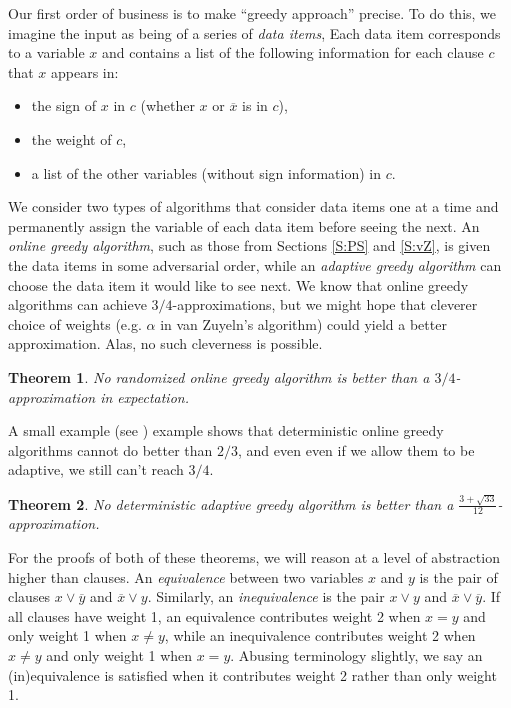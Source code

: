 \documentclass[11pt,letter]{article}
\newtheorem{theorem}{Theorem}
\numberwithin{theorem}{section}
\newcommand{\ol}{\overline}
\begin{document}
Our first order of business is to make ``greedy approach'' precise.
To do this, we imagine the input as being of a series of \emph{data items},
Each data item corresponds to a variable $x$
and contains a list of the following information
for each clause $c$ that $x$ appears in:
\begin{itemize}
\item
  the sign of $x$ in $c$ (whether $x$ or $\ol{x}$ is in $c$),
\item
  the weight of $c$,
\item
  a list of the other variables (without sign information) in $c$.
\end{itemize}
We consider two types of algorithms that consider data items one at a time
and permanently assign the variable of each data item before seeing the next.
An \emph{online greedy algorithm},
such as those from Sections \ref{S:PS} and \ref{S:vZ},
is given the data items in some adversarial order,
while an \emph{adaptive greedy algorithm}
can choose the data item it would like to see next.
We know that online greedy algorithms can achieve $3/4$-approximations,
but we might hope that cleverer choice of weights
(e.g. $\alpha$ in van Zuyeln's algorithm)
could yield a better approximation.
Alas, no such cleverness is possible.

\begin{theorem}\label{theorem:greedyRandomized}
  No randomized online greedy algorithm
  is better than a $3/4$-approximation in expectation.
\end{theorem}

A small example (see \cite{DBLP:conf/esa/Poloczek11}) example shows that
deterministic online greedy algorithms cannot do better than $2/3$,
and even even if we allow them to be adaptive, we still can't reach $3/4$.

\begin{theorem}\label{theorem:greedyDeterministic}
  No deterministic adaptive greedy algorithm
  is better than a $\frac{3 + \sqrt{33}}{12}$-approximation.
\end{theorem}

For the proofs of both of these theorems,
we will reason at a level of abstraction higher than clauses.
An \emph{equivalence} between two variables $x$ and $y$
is the pair of clauses $x \lor \ol{y}$ and $\ol{x} \lor y$.
Similarly, an \emph{inequivalence} is
the pair $x \lor y$ and $\ol{x} \lor \ol{y}$.
If all clauses have weight 1,
an equivalence contributes weight 2 when $x = y$
and only weight 1 when $x \neq y$,
while an inequivalence contributes weight 2 when $x \neq y$
and only weight 1 when $x = y$.
Abusing terminology slightly,
we say an (in)equivalence is satisfied
when it contributes weight 2 rather than only weight 1.
\end{document}

